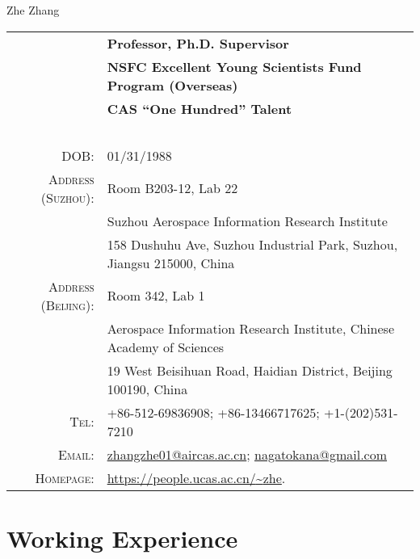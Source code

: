 \documentclass[paper=a4,fontsize=11pt]{scrartcl}
\newcommand{\sepspace}{\vspace*{1em}}		%
\newcommand{\MyName}[1]{
		\Huge \usefont{OT1}{phv}{b}{n} \hfill #1 		%
		\par \normalsize \normalfont}
\newcommand{\MySlogan}[1]{
		\large \usefont{OT1}{phv}{m}{n}\hfill \textit{#1} %
		\par \normalsize \normalfont}
\begin{document}

\MyName{Zhe Zhang}

\sepspace


\begin{tabular}{rl}
	& \textbf{Professor, Ph.D. Supervisor} \\
	& \textbf{NSFC Excellent Young Scientists Fund Program (Overseas)} \\
	& \textbf{CAS ``One Hundred'' Talent} \\
	~&~\\
\textsc{DOB:} & 01/31/1988 \\
\textsc{Address (Suzhou):} &  Room B203-12, Lab 22 \\
& Suzhou Aerospace Information Research Institute \\
& 158 Dushuhu Ave, Suzhou Industrial Park, Suzhou, Jiangsu 215000, China \\
\textsc{Address (Beijing):}	&  Room 342, Lab 1 \\
& Aerospace Information Research Institute, Chinese Academy of Sciences \\
& 19 West Beisihuan Road, Haidian District, Beijing 100190, China \\
\textsc{Tel:} & +86-512-69836908; +86-13466717625; +1-(202)531-7210\\
\textsc{Email:} & \href{mailto:zhangzhe01@aircas.ac.cn}{zhangzhe01@aircas.ac.cn}; \href{mailto:nagatokana@gmail.com}{nagatokana@gmail.com} \\
\textsc{Homepage:} & \href{https://people.ucas.ac.cn/~zhe}{https://people.ucas.ac.cn/{\textasciitilde}zhe}.
\end{tabular}


\section*{Working Experience}
\end{document}
